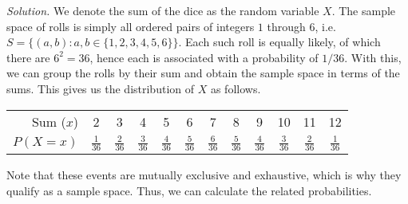 \documentclass[10pt]{article}
\begin{document}
        \textit{Solution.} We denote the sum of the dice as the random variable $X$. The sample space of rolls is simply all ordered pairs
        of integers $1$ through $6$, i.e.\ $S = \{(a, b)\colon a, b \in \{1, 2, 3, 4, 5, 6\}\}$. Each such roll is equally likely, of which
        there are $6^2 = 36$, hence each is associated with a probability of $1 /36$. With this, we can group the rolls by their sum
        and obtain the sample space in terms of the sums. This gives us the distribution of $X$ as follows.
        \begin{center}
                \begin{tabular}{r|ccccccccccc}
                        Sum ($x$)& 2&3&4&5&6&7&8&9&10&11&12 \\
                        $P(X = x)$& $\frac{1}{36}$& $\frac{2}{36}$ & $\frac{3}{36}$ & $\frac{4}{36}$ & $\frac{5}{36}$ & $\frac{6}{36}$ & $\frac{5}{36}$
                        & $\frac{4}{36}$ & $\frac{3}{36}$ & $\frac{2}{36}$ & $\frac{1}{36}$
                \end{tabular}
        \end{center}
        Note that these events are mutually exclusive and exhaustive, which is why they qualify as a sample space.
        Thus, we can calculate the related probabilities.
\end{document}
